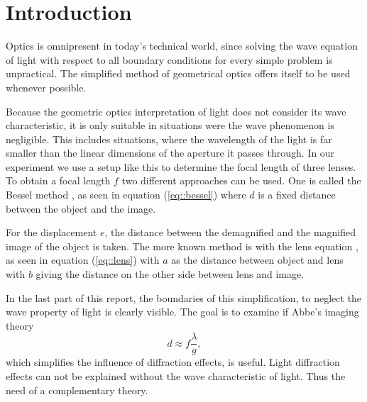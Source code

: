 \section{Introduction}
Optics is omnipresent in today's technical world,
since solving the wave equation of light with respect to all boundary conditions for every simple problem is unpractical.
The simplified method of geometrical optics offers itself to be used whenever possible.

Because the geometric optics interpretation of light does not consider its wave characteristic, it is only suitable in situations were the wave phenomenon is negligible.
This includes situations, where the wavelength of the light is far smaller than the linear dimensions of the aperture it passes through. 
In our experiment we use a setup like this to determine the focal length of three lenses. 
To obtain a focal length $f$ two different approaches can be used.
One is called the Bessel method \cite {manual}, as seen in equation (\ref{eq::bessel})
where $d$ is a fixed distance between the object and the image.


For the displacement $e$, the distance between the demagnified and the magnified image of the object is taken.
The more known method is with the lens equation \cite{manual}, as seen in equation (\ref{eq::lens})
with $a$ as the distance between object and lens with $b$ giving the distance on the other side between lens and image.

In the last part of this report, the boundaries of this simplification, to neglect the wave property of light is clearly visible. 
The goal is to examine if Abbe's imaging theory \cite{manual}
\begin{equation}
d \approx f\frac{\lambda}{g},
\label{eq::diff}
\end{equation}
which simplifies the influence of diffraction effects, is useful. 
Light diffraction effects can not be explained without the wave characteristic of light.
Thus the need of a complementary theory.
